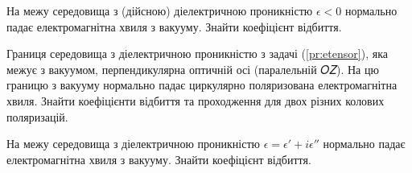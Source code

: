 \begin{problem}
На межу середовища з (дійсною) діелектричною проникністю  $\epsilon < 0 $  нормально падає електромагнітна хвиля з вакууму. Знайти коефіцієнт відбиття.
\end{problem}


\begin{problem}%
Границя середовища з діелектричною проникністю з задачі (\ref{pr:etensor}), яка межує з вакуумом,
перпендикулярна оптичній осі (паралельній 𝑂𝑍). На цю границю з вакууму нормально падає циркулярно
поляризована електромагнітна хвиля. Знайти коефіцієнти відбиття та проходження для двох різних колових
поляризацій.
\end{problem}



\begin{problem}
На межу середовища з діелектричною проникністю $\epsilon = \epsilon' + i\epsilon''$  нормально падає електромагнітна хвиля з вакууму. Знайти коефіцієнт відбиття.
\end{problem}

